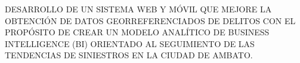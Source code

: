 \begin{nohyphens}
	\uppercase{ Desarrollo de un sistema web y móvil que mejore la obtención de
		datos georreferenciados de delitos con el propósito de crear un modelo
		analítico de Business Intelligence (BI) orientado al
		seguimiento de las tendencias de siniestros en la ciudad de Ambato.}
\end{nohyphens}